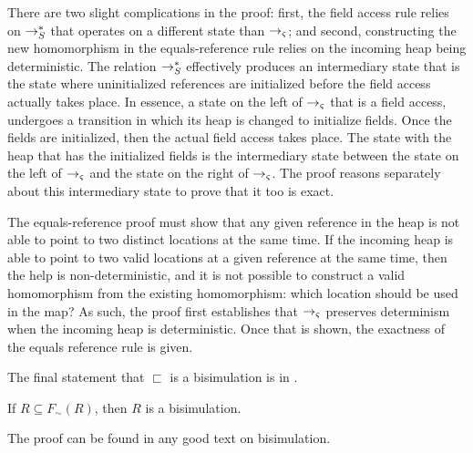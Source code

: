 There are two slight complications in the proof: first, the field
access rule relies on $\rightarrow_S^*$ that operates on a different
state than $\rightarrow_{\varsigma}$; and second, constructing the new
homomorphism in the equals-reference rule relies on the incoming heap
being deterministic. The relation $\rightarrow_S^*$ effectively produces
an intermediary state that is the state where uninitialized references
are initialized before the field access actually takes place. In
essence, a state on the left of $\rightarrow_{\varsigma}$ that is a
field access, undergoes a transition in which its heap is changed to
initialize fields. Once the fields are initialized, then the actual
field access takes place. The state with the heap that has the
initialized fields is the intermediary state between the state on the
left of $\rightarrow_{\varsigma}$ and the state on the right of $\rightarrow_{\varsigma}$. The proof reasons separately about this
intermediary state to prove that it too is exact.

The equals-reference proof must show that any given reference in the
heap is not able to point to two distinct locations at the same
time. If the incoming heap is able to point to two valid locations at
a given reference at the same time, then the help is
non-deterministic, and it is not possible to construct a valid
homomorphism from the existing homomorphism: which location should be
used in the map? As such, the proof first establishes that
$\rightarrow_{\varsigma}$ preserves determinism when the incoming heap is
deterministic. Once that is shown, the exactness of the equals
reference rule is given.

The final statement that $\sqsubset$ is a bisimulation is in .

\begin{theorem}
If $R \subseteq F_\sim(R)$, then $R$ is a bisimulation.
\label{lem:bisim}
\end{theorem}
The proof can be found in any good text on bisimulation.




